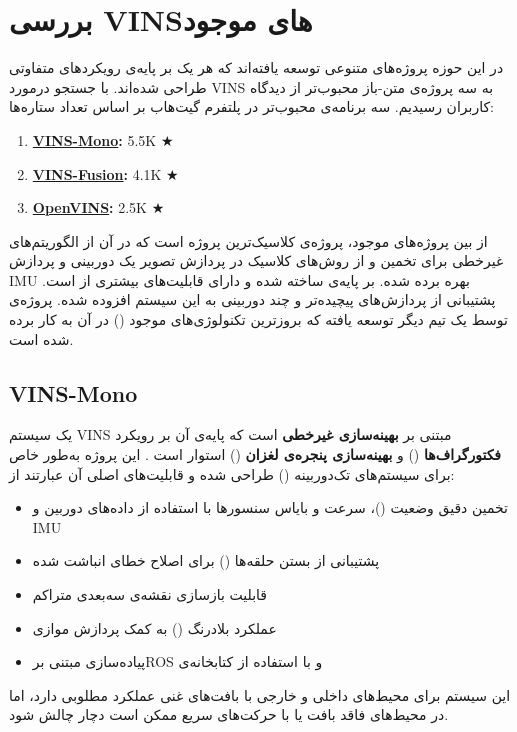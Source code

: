 \documentclass[11pt, a4paper]{article}
\begin{document}
	
	\section{بررسی \gls{VINS}‌های موجود}
	در این حوزه پروژه‌های متنوعی توسعه یافته‌اند که هر یک بر پایه‌ی رویکردهای متفاوتی طراحی شده‌اند. با جستجو  درمورد 
	\gls{VINS}
	به سه پروژه‌ی متن‌-باز محبوب‌تر از دیدگاه کاربران رسیدیم. سه برنامه‌ی محبوب‌تر در پلتفرم گیت‌هاب بر اساس تعداد ستاره‌ها:
	\begin{latin}
		\begin{enumerate}
			\item \textbf{\href{https://github.com/HKUST-Aerial-Robotics/VINS-Mono}{VINS-Mono}:} 5.5K $\bigstar$
			\item \textbf{\href{https://github.com/HKUST-Aerial-Robotics/VINS-Fuesion}{VINS-Fusion}:} 4.1K $\bigstar$
			\item \textbf{\href{https://github.com/rpng/open_vins}{OpenVINS}:} 2.5K $\bigstar$
		\end{enumerate}
	\end{latin}
	
	از بین پروژه‌های موجود، پروژه‌ی 
	 کلاسیک‌ترین پروژه است که در آن از الگوریتم‌های غیرخطی برای تخمین و از روش‌های کلاسیک در پردازش تصویر  یک دوربینی و پردازش \gls{IMU} بهره برده شده. 
	 بر پایه‌ی
	 ساخته شده و دارای قابلیت‌های بیشتری از 
	است. پشتیبانی از پردازش‌های پیچیده‌تر و چند دوربینی به این سیستم افزوده شده. پروژه‌ی 
	 توسط یک تیم دیگر توسعه یافته که بروزترین تکنولوژی‌های موجود 
	() در آن به کار برده شده است.
	
	
	\subsection{VINS-Mono}
	یک سیستم \gls{VINS}
	مبتنی بر \textbf{بهینه‌سازی غیرخطی} است که پایه‌ی آن بر رویکرد \textbf{فکتورگراف‌ها}
	()
	و \textbf{بهینه‌سازی پنجره‌ی لغزان} 
	()
	استوار است
	\cite{qin2018vins}.
	این پروژه به‌طور خاص برای سیستم‌های تک‌دوربینه ()
	طراحی شده و قابلیت‌های اصلی آن عبارتند از:
	\begin{itemize}
		\item تخمین دقیق وضعیت ()، سرعت و بایاس سنسورها با استفاده از داده‌های دوربین و \gls{IMU}
		\item پشتیبانی از بستن حلقه‌ها () برای اصلاح خطای انباشت شده
		\item قابلیت بازسازی نقشه‌ی سه‌بعدی متراکم
		\item عملکرد بلادرنگ () به کمک پردازش موازی
		\item پیاده‌سازی مبتنی بر\gls{ROS}  و 
		با استفاده از کتابخانه‌ی 
	\end{itemize}
	این سیستم برای محیط‌های داخلی و خارجی با بافت‌های غنی عملکرد مطلوبی دارد، اما در محیط‌های فاقد بافت یا با حرکت‌های سریع ممکن است دچار چالش شود.
	
\end{document}
